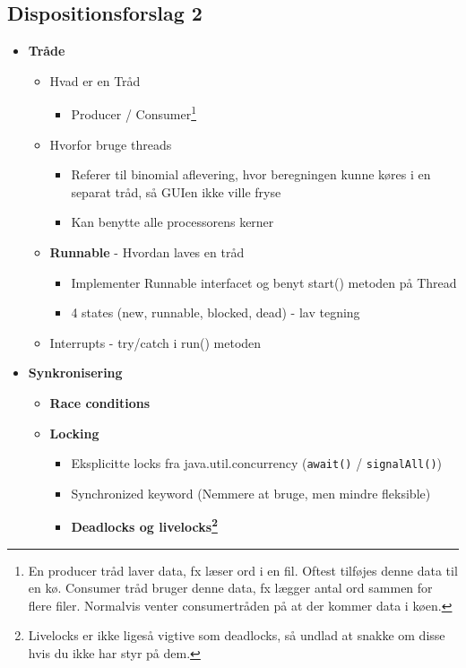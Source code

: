\subsection{Dispositionsforslag 2}

\begin{itemize}
    \item \textbf{Tråde}
    \begin{itemize}
        \item Hvad er en Tråd
        \begin{itemize}
            \item Producer / Consumer\footnote{En producer tråd laver data, fx læser ord i en fil. Oftest tilføjes denne data til en kø. Consumer tråd bruger denne data, fx lægger antal ord sammen for flere filer. Normalvis venter consumertråden på at der kommer data i køen.}
        \end{itemize}
        
        \item Hvorfor bruge threads
        \begin{itemize}
            \item Referer til binomial aflevering, hvor beregningen kunne køres i en separat tråd, så GUIen ikke ville fryse
            \item Kan benytte alle processorens kerner
        \end{itemize}
        
        \item \textbf{Runnable} - Hvordan laves en tråd
        \begin{itemize}
            \item Implementer Runnable interfacet og benyt start() metoden på Thread
            \item 4 states (new, runnable, blocked, dead) - lav tegning
        \end{itemize}
        
        \item Interrupts - try/catch i run() metoden
    \end{itemize}
    
    \item \textbf{Synkronisering}
    \begin{itemize}
        \item \textbf{Race conditions}
        \item \textbf{Locking}
        \begin{itemize}
            \item Eksplicitte locks fra java.util.concurrency (\verb|await()| / \verb|signalAll()|)
            \item Synchronized keyword (Nemmere at bruge, men mindre fleksible)
            \item \textbf{Deadlocks og livelocks\footnote{Livelocks er ikke ligeså vigtive som deadlocks, så undlad at snakke om disse hvis du ikke har styr på dem.}}
        \end{itemize}
        

\end{itemize}
\end{itemize}
